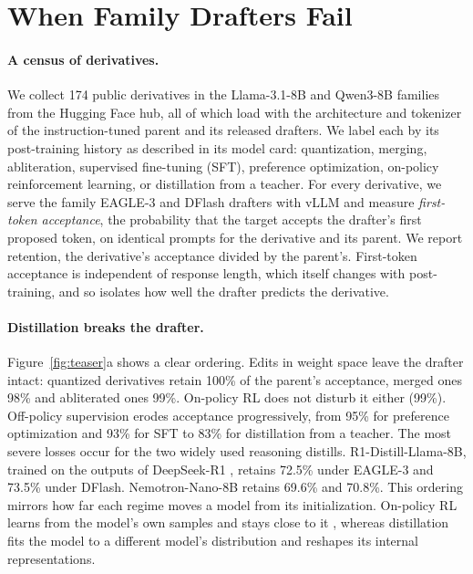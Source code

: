 \documentclass[11pt]{article}
\begin{document}
\section{When Family Drafters Fail}
\label{sec:census}

\paragraph{A census of derivatives.}
We collect 174 public derivatives in the Llama-3.1-8B and Qwen3-8B families \citep{llama3herd,qwen3} from the Hugging Face hub, all of which load with the architecture and tokenizer of the instruction-tuned parent and its released drafters.
We label each by its post-training history as described in its model card: quantization, merging, abliteration, supervised fine-tuning (SFT), preference optimization, on-policy reinforcement learning, or distillation from a teacher.
For every derivative, we serve the family EAGLE-3 and DFlash drafters with vLLM \citep{kwon2023vllm} and measure \emph{first-token acceptance}, the probability that the target accepts the drafter's first proposed token, on identical prompts for the derivative and its parent.
We report retention, the derivative's acceptance divided by the parent's.
First-token acceptance is independent of response length, which itself changes with post-training, and so isolates how well the drafter predicts the derivative.

\paragraph{Distillation breaks the drafter.}
Figure~\ref{fig:teaser}a shows a clear ordering.
Edits in weight space leave the drafter intact: quantized derivatives retain 100\% of the parent's acceptance, merged ones 98\% and abliterated ones 99\%.
On-policy RL does not disturb it either (99\%).
Off-policy supervision erodes acceptance progressively, from 95\% for preference optimization and 93\% for SFT to 83\% for distillation from a teacher.
The most severe losses occur for the two widely used reasoning distills.
R1-Distill-Llama-8B, trained on the outputs of DeepSeek-R1 \citep{deepseek2025r1}, retains 72.5\% under EAGLE-3 and 73.5\% under DFlash.
Nemotron-Nano-8B \citep{bercovich2025nemotron} retains 69.6\% and 70.8\%.
This ordering mirrors how far each regime moves a model from its initialization.
On-policy RL learns from the model's own samples and stays close to it \citep{shenfeld2026razor,chen2026retaining}, whereas distillation fits the model to a different model's distribution \citep{hinton2015distilling,kim2016sequence} and reshapes its internal representations.
\end{document}
